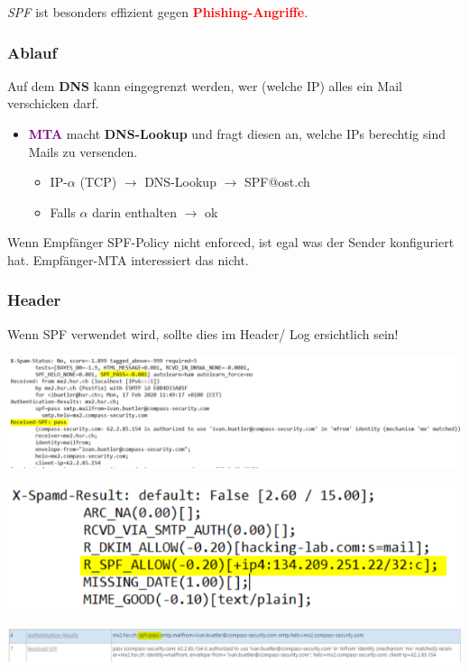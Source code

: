 \textit{SPF} ist besonders effizient gegen \textcolor{red}{\textbf{Phishing-Angriffe}}.

\subsubsection{Ablauf}
Auf dem \textbf{DNS} kann eingegrenzt werden, wer (welche IP) alles ein Mail verschicken darf.
\begin{itemize}
    \item \textcolor{purple}{\textbf{MTA}} macht \textbf{DNS-Lookup} und fragt diesen an, welche IPs berechtig sind Mails zu versenden.
    \begin{itemize}
        \item IP-$\alpha$ (TCP) $\rightarrow$ DNS-Lookup $\rightarrow$ SPF@ost.ch
        \item Falls $\alpha$ darin enthalten $\rightarrow$ ok
    \end{itemize}
\end{itemize}

Wenn Empfänger SPF-Policy nicht enforced, ist egal was der Sender konfiguriert hat. Empfänger-MTA interessiert das nicht.\\

\subsubsection{Header}
Wenn SPF verwendet wird, sollte dies im Header/ Log ersichtlich sein!
\begin{center}
    \vspace{-8pt}
    \includegraphics[width=1.0\linewidth]{./img/07-mail_security/spf}
    \vspace{-8pt}
\end{center}
\begin{center}
    \vspace{-8pt}
    \includegraphics[width=.6\linewidth]{./img/07-mail_security/spf2}
    \vspace{-8pt}
\end{center}
\begin{center}
    \vspace{-8pt}
    \includegraphics[width=1.0\linewidth]{./img/07-mail_security/spf3}
    \vspace{-8pt}
\end{center}

